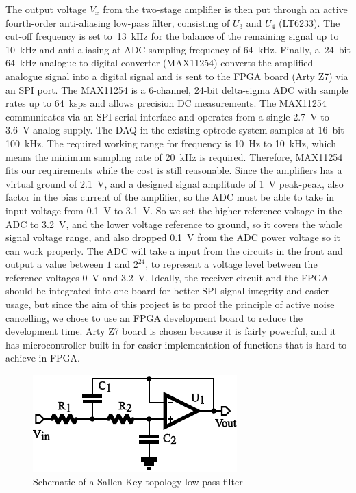 The output voltage $V_x$ from the two-stage amplifier is then put through an active fourth-order anti-aliasing low-pass filter, consisting of $U_3$ and $U_4$ (LT6233).  The cut-off frequency is set to~\qty{13}{kHz} for the balance of the remaining signal up to \qty{10}{kHz} and anti-aliasing at ADC sampling frequency of \qty{64}{kHz}. Finally, a~\qty{24}{bit} \qty{64}{kHz} analogue to digital converter (MAX11254) converts the amplified analogue signal into a digital signal and is sent to the FPGA board (Arty Z7) via an SPI port.  The MAX11254 is a 6-channel, 24-bit delta-sigma ADC with sample rates up to \qty{64}{ksps} and allows precision DC measurements. The MAX11254 communicates via an SPI serial interface and operates from a single \qty{2.7}{V} to \qty{3.6}{V} analog supply.  The DAQ in the existing optrode system samples at \qty{16}{bit} \qty{100}{kHz}.  The required working range for frequency is \qty{10}{Hz} to \qty{10}{kHz}, which means the minimum sampling rate of \qty{20}{kHz} is required.  Therefore, MAX11254 fits our requirements while the cost is still reasonable.  Since the amplifiers has a virtual ground of \qty{2.1}{V}, and a designed signal amplitude of \qty{1}{V} peak-peak, also factor in the bias current of the amplifier, so the ADC must be able to take in input voltage from \qty{0.1}{V} to \qty{3.1}{V}.  So we set the higher reference voltage in the ADC to \qty{3.2}{V}, and the lower voltage reference to ground, so it covers the whole signal voltage range, and also dropped \qty{0.1}{V} from the ADC power voltage so it can work properly.  The ADC will take a input from the circuits in the front and output a value between $1$ and $2^{24}$, to represent a voltage level between the reference voltages \qty{0}{V} and \qty{3.2}{V}.  Ideally, the receiver circuit and the FPGA should be integrated into one board for better SPI signal integrity and easier usage, but since the aim of this project is to proof the principle of active noise cancelling, we chose to use an FPGA development board to reduce the development time.  Arty Z7 board is chosen because it is fairly powerful, and it has microcontroller built in for easier implementation of functions that is hard to achieve in FPGA.

\begin{figure}[h]
\centerline{\includegraphics[scale=1]{4-ANC_Sys/SallenKeyLPF.pdf}}
\caption{Schematic of a Sallen-Key topology low pass filter}
\label{fig_SallenKeyLPF}
\end{figure}

